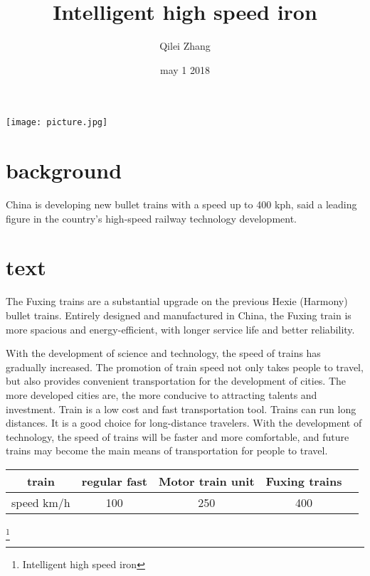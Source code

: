 \documentclass[10pt]{article}
\begin{document}
\title{Intelligent high speed iron}
\author{Qilei Zhang}
\date{may 1 2018}
\maketitle
\par
\par
\texttt{[image: picture.jpg]}
\section{background}
China is developing new bullet trains with a speed up to 400 kph, said a leading figure in the country's high-speed railway technology development.
\par
\section{text}
The Fuxing trains are a substantial upgrade on the previous Hexie (Harmony) bullet trains. Entirely designed and manufactured in China, the Fuxing train is more spacious and energy-efficient, with longer service life and better reliability.
\par
With the development of science and technology, the speed of trains has gradually increased. The promotion of train speed not only takes people to travel, but also provides convenient transportation for the development of cities. The more developed cities are, the more conducive to attracting talents and investment. Train is a low cost and fast transportation tool. Trains can run long distances. It is a good choice for long-distance travelers. With the development of technology, the speed of trains will be faster and more comfortable, and future trains may become the main means of transportation for people to travel.\\
\par
\begin{tabular}{|c|c|c|c|p{20em}}
\hline
train      & regular fast & Motor train unit & Fuxing trains\\
\hline
speed km/h &    100       &  250             &  400\\
\hline
\end{tabular}
\footnote{\centering Intelligent high speed iron}
\end{document}
